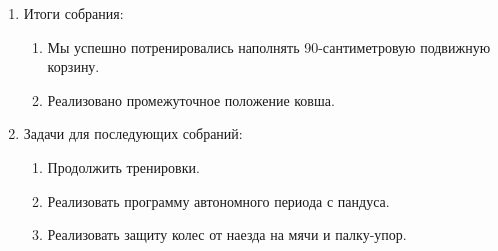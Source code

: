 \begin{enumerate}
\begin{enumerate}
	\end{enumerate}
	
	\item Итоги собрания:
	\begin{enumerate}
		
		\item Мы успешно потренировались наполнять 90-сантиметровую подвижную корзину.
		
		\item Реализовано промежуточное положение ковша.
		
	\end{enumerate}
	
	\item Задачи для последующих собраний:
	\begin{enumerate}
		
		\item Продолжить тренировки.
		
		\item Реализовать программу автономного периода с пандуса.
		
		\item Реализовать защиту колес от наезда на мячи и палку-упор.
			
	\end{enumerate}
\end{enumerate}
\fillpage
